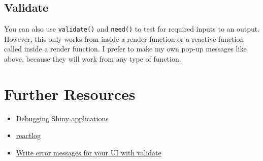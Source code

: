 \documentclass[
  oneside]{book}
\newenvironment{Shaded}{\begin{snugshade}}{\end{snugshade}}
\newcommand{\CommentTok}[1]{\textcolor[rgb]{0.56,0.35,0.01}{\textit{#1}}}
\newcommand{\ControlFlowTok}[1]{\textcolor[rgb]{0.13,0.29,0.53}{\textbf{#1}}}
\newcommand{\FunctionTok}[1]{\textcolor[rgb]{0.00,0.00,0.00}{#1}}
\newcommand{\NormalTok}[1]{#1}
\newcommand{\OtherTok}[1]{\textcolor[rgb]{0.56,0.35,0.01}{#1}}
\newcommand{\SpecialCharTok}[1]{\textcolor[rgb]{0.00,0.00,0.00}{#1}}
\newcommand{\StringTok}[1]{\textcolor[rgb]{0.31,0.60,0.02}{#1}}
\providecommand{\tightlist}{%
  \setlength{\itemsep}{0pt}\setlength{\parskip}{0pt}}
\begin{document}
\hypertarget{validate}{%
\subsection{Validate}\label{validate}}

You can also use \texttt{validate}\texttt{()} and \texttt{need}\texttt{()} to test for required inputs to an output. However, this only works from inside a render function or a reactive function called inside a render function. I prefer to make my own pop-up messages like above, because they will work from any type of function.

\begin{Shaded}
\end{Shaded}

\hypertarget{resources-debugging}{%
\section{Further Resources}\label{resources-debugging}}

\begin{itemize}
\tightlist
\item
  \href{https://shiny.rstudio.com/articles/debugging.html}{Debugging Shiny applications}
\item
  \href{https://rstudio.github.io/reactlog/}{reactlog}
\item
  \href{https://shiny.rstudio.com/articles/validation.html}{Write error messages for your UI with validate}
\end{itemize}
\end{document}

